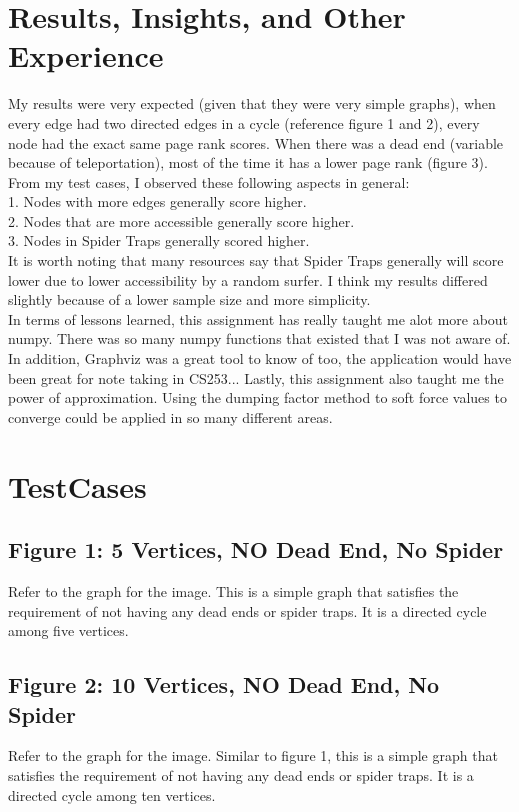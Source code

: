\documentclass{article}
\begin{document}
\section{Results, Insights, and Other Experience}
My results were very expected (given that they were very simple graphs), when every edge had two directed edges in a cycle (reference figure 1 and 2), every node had the exact same page rank scores. When there was a dead end (variable because of teleportation), most of the time it has a lower page rank (figure 3). \\

From my test cases, I observed these following aspects in general:\\
1. Nodes with more edges generally score higher. \\
2. Nodes that are more accessible generally score higher. \\
3. Nodes in Spider Traps generally scored higher. \\

It is worth noting that many resources say that Spider Traps generally will score lower due to lower accessibility by a random surfer. I think my results differed slightly because of a lower sample size and more simplicity. \\

In terms of lessons learned, this assignment has really taught me alot more about numpy. There was so many numpy functions that existed that I was not aware of. In addition, Graphviz was a great tool to know of too, the application would have been great for note taking in CS253... Lastly, this assignment also taught me the power of approximation. Using the dumping factor method to soft force values to converge could be applied in so many different areas.

\section{TestCases}
\subsection{Figure 1: 5 Vertices, NO Dead End, No Spider}
Refer to the graph for the image. This is a simple graph that satisfies the requirement of not having any dead ends or spider traps. It is a directed cycle among five vertices.
\subsection{Figure 2: 10 Vertices, NO Dead End, No Spider}
Refer to the graph for the image. Similar to figure 1, this is a simple graph that satisfies the requirement of not having any dead ends or spider traps. It is a directed cycle among ten vertices.
\end{document}

